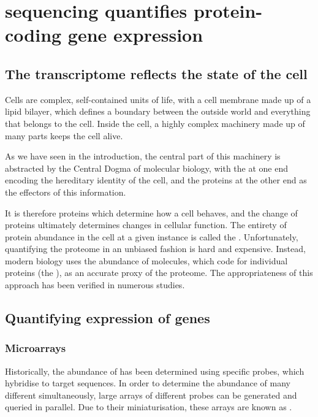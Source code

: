 \chapter{ sequencing quantifies protein-coding gene expression}

\section{The transcriptome reflects the state of the cell}

Cells are complex, self-contained units of life, with a cell membrane made up of
a lipid bilayer, which defines a boundary between the outside world and
everything that belongs to the cell. Inside the cell, a highly complex machinery
made up of many parts keeps the cell alive.

As we have seen in the introduction, the central part of this machinery is
abstracted by the Central Dogma of molecular biology, with the \dna at one end
encoding the hereditary identity of the cell, and the proteins at the other end
as the effectors of this information.

It is therefore proteins which determine how a cell behaves, and the change of
proteins ultimately determines changes in cellular function. The entirety of
protein abundance in the cell at a given instance is called the
. Unfortunately, quantifying the proteome in an unbiased
fashion is hard and expensive. Instead, modern biology uses the
abundance of \mrna molecules, which code for individual proteins (the
), as an accurate proxy of the proteome. The
appropriateness of this approach has been verified in numerous
studies.


\section{Quantifying expression of  genes}

\subsection{Microarrays}

Historically, the abundance of \mrna has been determined using specific probes,
which hybridise to target \mrna sequences. In order to determine the abundance
of many different \mrna[s] simultaneously, large arrays of different probes can
be generated and queried in parallel. Due to their miniaturisation, these arrays
are known as .

